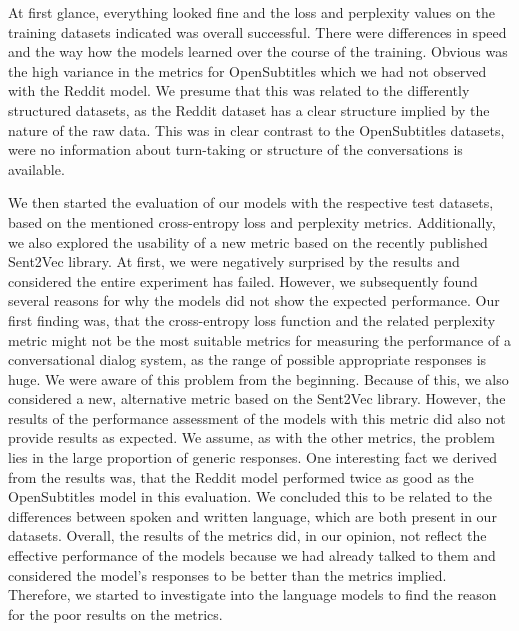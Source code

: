 At first glance, everything looked fine and the loss and perplexity values on the training datasets indicated was overall successful. There were differences in speed and the way how the models learned over the course of the training. Obvious was the high variance in the metrics for OpenSubtitles which we had not observed with the Reddit model. We presume that this was related to the differently structured datasets, as the Reddit dataset has a clear structure implied by the nature of the raw data. This was in clear contrast to the OpenSubtitles datasets, were no information about turn-taking or structure of the conversations is available.

We then started the evaluation of our models with the respective test datasets, based on the mentioned cross-entropy loss and perplexity metrics. Additionally, we also explored the usability of a new metric based on the recently published Sent2Vec library. At first, we were negatively surprised by the results and considered the entire experiment has failed. However, we subsequently found several reasons for why the models did not show the expected performance. Our first finding was, that the cross-entropy loss function and the related perplexity metric might not be the most suitable metrics for measuring the performance of a conversational dialog system, as the range of possible appropriate responses is huge. We were aware of this problem from the beginning. Because of this, we also considered a new, alternative metric based on the Sent2Vec library. However, the results of the performance assessment of the models with this metric did also not provide results as expected. We assume, as with the other metrics, the problem lies in the large proportion of generic responses. One interesting fact we derived from the results was, that the Reddit model performed twice as good as the OpenSubtitles model in this evaluation. We concluded this to be related to the differences between spoken and written language, which are both present in our datasets. Overall, the results of the metrics did, in our opinion, not reflect the effective performance of the models because we had already talked to them and considered the model's responses to be better than the metrics implied. Therefore, we started to investigate into the language models to find the reason for the poor results on the metrics.

